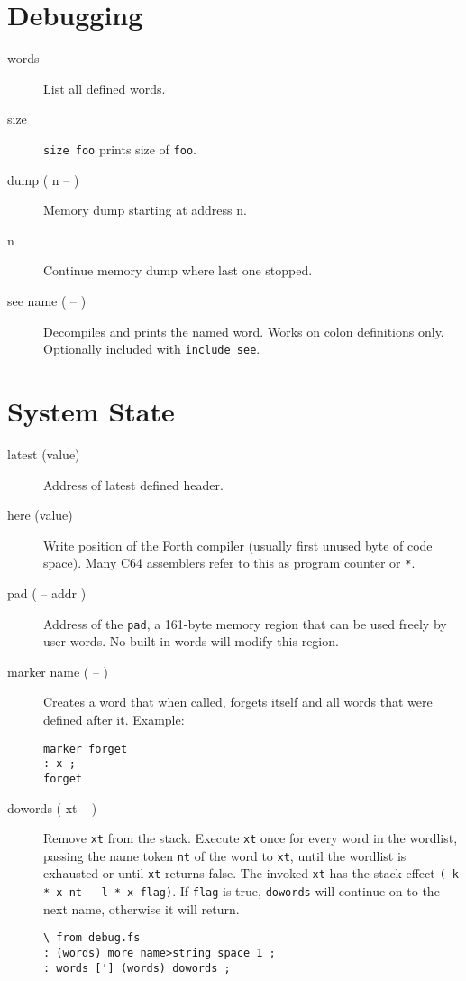 \section{Debugging}

\begin{description}
\item[words] List all defined words.
\item[size] \texttt{size foo} prints size of \texttt{foo}.
\item[dump ( n -- )] Memory dump starting at address n.
\item[n] Continue memory dump where last one stopped.
\item[see name ( -- )] Decompiles and prints the named word. Works on colon definitions only. Optionally included with \texttt{include see}.
\end{description}

\section{System State}

\begin{description}


\item[latest (value)] Address of latest defined header.

\item[here (value)] Write position of the Forth compiler (usually first unused byte of code space). Many C64 assemblers refer to this as program counter or \texttt{*}.

\item[pad ( -- addr )] Address of the \texttt{pad}, a 161-byte memory region that can be used freely by user words. No built-in words will modify this region.

\item[marker name ( -- )] Creates a word that when called, forgets itself and all words that were defined after it. Example:

\begin{verbatim}
marker forget
: x ;
forget
\end{verbatim}

\item[dowords ( xt -- )] Remove \texttt{xt} from the stack. Execute \texttt{xt} once for every word in the wordlist, passing the name token \texttt{nt} of the word to \texttt{xt}, until the wordlist is exhausted or until \texttt{xt} returns false. The invoked \texttt{xt} has the stack effect \texttt{( k * x nt -- l * x flag)}. If \texttt{flag} is true, \texttt{dowords} will continue on to the next name, otherwise it will return.

\begin{verbatim}
\ from debug.fs
: (words) more name>string space 1 ;
: words ['] (words) dowords ;
\end{verbatim}
\end{description}

